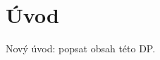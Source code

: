 \documentclass[dp.tex]{subfiles}
\begin{document}
\chapter*{Úvod}
\label{chap:uvod} 




Nový úvod: popsat obsah této DP.
\end{document}
